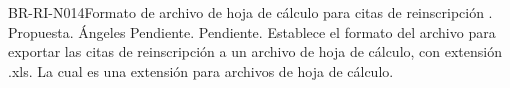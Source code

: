 \begin{BusinessRule}{BR-RI-N014}{Formato de archivo de hoja de cálculo para citas de reinscripción}
	{\bcDerivation}   %
	{\btTimer}    %
	{\blInfluencing}    %
	.
	\BRItem[Estado] Propuesta.
	 Ángeles 
	 Pendiente.
	 Pendiente.
	\BRItem[Descripción] Establece el formato del archivo para exportar las citas de reinscripción a un archivo de hoja de cálculo, con extensión .xls. La cual es una extensión para archivos de hoja de cálculo. \\
	

\end{BusinessRule}
